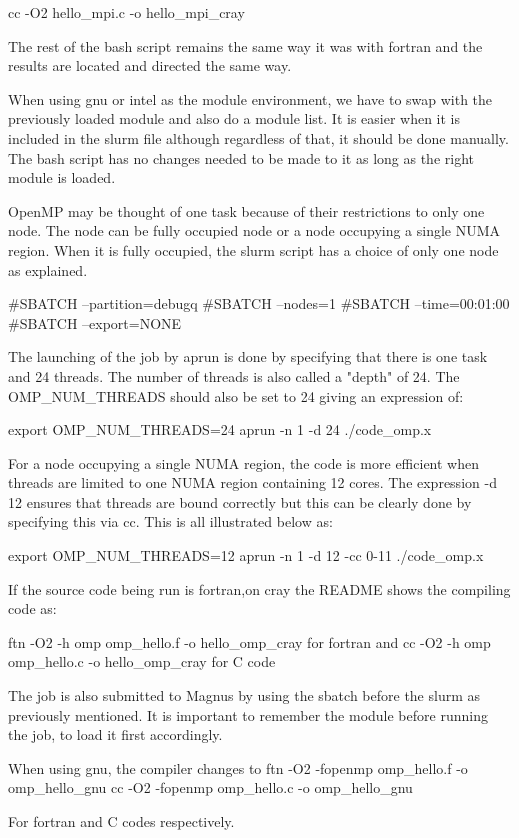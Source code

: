 \begin{Document}
{cc -O2 hello_mpi.c -o hello_mpi_cray

The rest of the bash script remains the same way it was with fortran and the results are located and directed the same way.

When using gnu or intel as the module environment, we have to swap with the previously loaded module and also do a module list. 
It is easier when it is included in the slurm file although regardless of that, it should be done manually.
The bash script has no changes needed to be made to it as long as the right module is loaded.


OpenMP may be thought of one task because of their restrictions to only one node.
The node can be fully occupied node or a node occupying a single NUMA region.
When it is fully occupied, the slurm script has a choice of only one node as explained.

#SBATCH --partition=debugq
#SBATCH --nodes=1
#SBATCH --time=00:01:00
#SBATCH --export=NONE

The launching of the job by aprun is done by specifying that there is one task and 24 threads. The number of threads is also called a "depth" of 24.
The OMP_NUM_THREADS should also be set to 24 giving an expression of:

export OMP_NUM_THREADS=24
aprun -n 1 -d 24 ./code_omp.x

For a node occupying a single NUMA region, the code is more efficient when threads are limited to one NUMA region containing 12 cores. 
The expression -d 12 ensures that threads are bound correctly but this can be clearly done by specifying this via cc.
This is all illustrated below as:

export OMP_NUM_THREADS=12
aprun -n 1 -d 12 -cc 0-11 ./code_omp.x

If the source code being run is fortran,on cray the README shows the compiling code as:

ftn -O2 -h omp omp_hello.f -o hello_omp_cray for fortran and
cc -O2 -h omp omp_hello.c -o hello_omp_cray for C code

The job is also submitted to Magnus by using the sbatch before the slurm as previously mentioned.
It is important to remember the module before running the job, to load it first accordingly.

When using gnu, the compiler changes to 
ftn -O2 -fopenmp omp_hello.f -o omp_hello_gnu
cc -O2 -fopenmp omp_hello.c -o omp_hello_gnu
 
For fortran and C codes respectively.

}
\end{Document}
